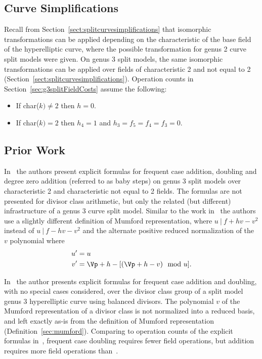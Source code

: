 \subsection{Curve Simplifications} 
\label{sect:g3splitcurvesimplifications}
Recall from Section~\ref{sect:splitcurvesimplifications} that isomorphic
transformations can be applied depending on the characteristic of the base field
of the hyperelliptic curve, where the possible transformation for genus 2 curve
split models were given. On genus 3 split models, the same isomorphic
transformations can be applied over fields of characteristic 2 and not equal to
2 (Section~\ref{sect:splitcurvesimplifications}). Operation counts in
Section~\ref{sec:g3splitFieldCosts} assume the following:
\begin{itemize}
\item  If char($k) \neq 2$ then $h = 0$.
\item  If char($k) = 2$ then $h_4 = 1$ and $h_3 = f_5 = f_4 = f_3 = 0$.
\end{itemize}


\subsection{Prior Work}
\label{sec:g3explSPLITPriorWork}

In~\cite{rad2019jacobian} the authors present explicit formulas for frequent
case addition, doubling and degree zero addition (referred to as baby steps) on
genus 3 split models over characteristic 2 and characteristic not equal to 2
fields. The formulas are not presented for divisor class arithmetic, but only
the related (but different) infrastructure of a genus 3 curve split model.
Similar to the work in~\cite{EricksonJacobsonStein_realg2_2011} the authors use
a slightly different definition of Mumford representation, where $u ~|~ f + hv -
v^2$ instead of $u ~|~ f - hv - v^2$ and the alternate positive reduced
normalization of the $v$ polynomial where 
\begin{align}
  u' & =  u \nonumber\\
  v' & =  \Vp + h - [(\Vp + h - v) \mod u]. 
\end{align}

In~\cite{Sutherland_g3_2019} the author presents explicit formulas for frequent
case addition and doubling, with no special cases considered, over the divisor
class group of a split model genus 3 hyperelliptic curve using balanced
divisors. The polynomial $v$ of the Mumford representation of a divisor class is
not normalized into a reduced basis, and left exactly as-is from the definition
of Mumford representation (Definition~\ref{sec:mumford}). Comparing to operation
counts of the explicit formulas in~\cite{rad2019jacobian}, frequent case
doubling requires fewer field operations, but addition requires more field
operations than~\cite{rad2019jacobian}.

